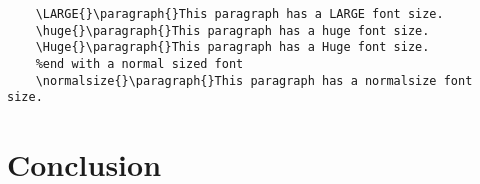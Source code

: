 \documentclass{article}
\begin{document}
\begin{lstlisting}
    \LARGE{}\paragraph{}This paragraph has a LARGE font size.
    \huge{}\paragraph{}This paragraph has a huge font size.
    \Huge{}\paragraph{}This paragraph has a Huge font size.
    %end with a normal sized font
    \normalsize{}\paragraph{}This paragraph has a normalsize font size.
    \end{lstlisting}
    \section{Conclusion}
    \label{Conclusion}
\end{document}
